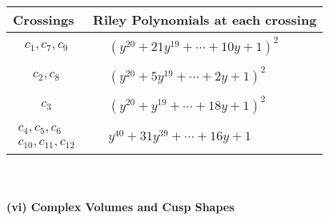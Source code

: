 \documentclass[1p]{elsarticle_modified}
\theoremstyle{definition}
\begin{document}
\begin{tabular}{m{50pt}|m{274pt}}
Crossings & \hspace{64pt}Riley Polynomials at each crossing \\
\hline $$\begin{aligned}c_{1},c_{7},c_{9}\end{aligned}$$&$\begin{aligned}
&(y^{20}+21 y^{19}+\cdots+10 y+1)^{2}
\end{aligned}$\\
\hline $$\begin{aligned}c_{2},c_{8}\end{aligned}$$&$\begin{aligned}
&(y^{20}+5 y^{19}+\cdots+2 y+1)^{2}
\end{aligned}$\\
\hline $$\begin{aligned}c_{3}\end{aligned}$$&$\begin{aligned}
&(y^{20}+y^{19}+\cdots+18 y+1)^{2}
\end{aligned}$\\
\hline $$\begin{aligned}c_{4},c_{5},c_{6}\\c_{10},c_{11},c_{12}\end{aligned}$$&$\begin{aligned}
&y^{40}+31 y^{39}+\cdots+16 y+1
\end{aligned}$\\
\hline
\end{tabular}\\~\\
\newpage\flushleft \textbf{(vi) Complex Volumes and Cusp Shapes}
\end{document}
